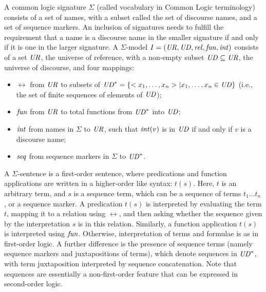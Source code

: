 \documentclass[10pt,%
\ifpretendfinal
final%
\else
draft%
\fi,
]{scrreprt}
\begin{document}
\begin{definition}\label{CommonLogic}   
A common logic signature
$\Sigma$ (called vocabulary in Common Logic terminology) consists of a
set of names, with a subset called the set of discourse names, and a
set of sequence markers. An inclusion of signatures needs to fulfill the
requirement that a name is a discourse
name in the smaller signature if and only if it is one in the larger signature.  A $\Sigma$-model $I=(\mathit{UR},\mathit{UD},\mathit{rel},\mathit{fun},\mathit{int})$ consists of a set $\mathit{UR}$,
the universe of reference, with a non-empty subset $\mathit{UD}\subseteq \mathit{UR}$,
the universe of discourse, and four mappings:
  \begin{itemize}
   \item $\rel$ from $\mathit{UR}$ to subsets of $\mathit{UD}^* = \{<x_1,\ldots,x_n> |
x_1,\ldots,x_n \in \mathit{UD}\}$ (i.e., the set of finite sequences of
elements of $\mathit{UD}$);
   \item $\mathit{fun}$ from $\mathit{UR}$ to total functions from $\mathit{UD}^*$ into $\mathit{UD}$;
   \item $\mathit{int}$ from names in $\Sigma$ to $\mathit{UR}$, such that
$\mathit{int}(v)$ is in $\mathit{UD}$ if and only if $v$ is a discourse name;
   \item $\mathit{seq}$ from sequence markers in $\Sigma$ to $\mathit{UD}^*$.
  \end{itemize}  A $\Sigma$-sentence is a first-order
sentence, where predications and function applications are written
in a higher-order like syntax: $t(s)$.
Here, $t$ is an arbitrary term, and $s$ is a sequence term, which can
be a sequence of terms $t_1\ldots t_n$, or a sequence marker.
A predication $t(s)$ is interpreted by evaluating the term $t$,
mapping it to a relation using $\rel$, and then asking whether the sequence
given by the interpretation $s$ is in this relation.  
Similarly, a function application $t(s)$ is interpreted using $\mathit{fun}$.
Otherwise, interpretation of terms and formulae is as in
first-order logic. 
A further
difference is the presence of sequence terms (namely sequence markers and
juxtapositions of terms), which denote sequences in $\mathit{UD}^*$, with term
juxtaposition interpreted by sequence concatenation.
Note that sequences are essentially a non-first-order feature that
can be expressed in second-order logic.


\end{definition}
\end{document}

